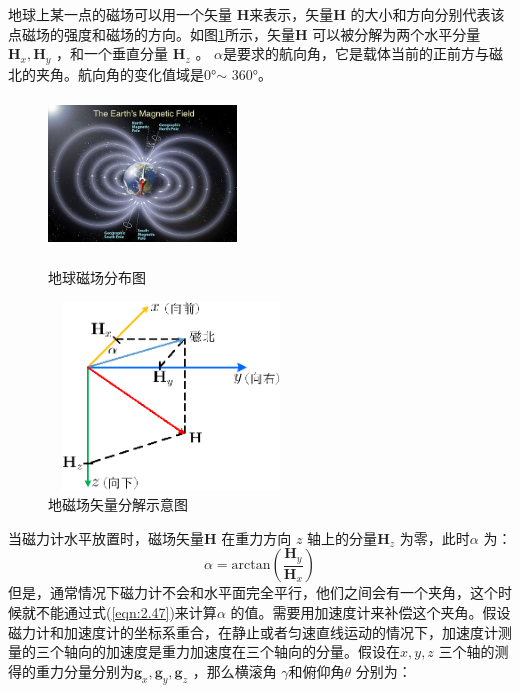 地球上某一点的磁场可以用一个矢量 $\mathbf{H} $来表示，矢量$\mathbf{H} $ 的大小和方向分别代表该点磁场的强度和磁场的方向。如图\ref{fig2_5}所示，矢量$\mathbf{H} $ 可以被分解为两个水平分量 $\mathbf{H}_x,\mathbf{H}_y$ ，和一个垂直分量 $\mathbf{H}_z$ 。 $\alpha$是要求的航向角，它是载体当前的正前方与磁北的夹角。航向角的变化值域是0°$\sim $ 360°。
\begin{figure}[h]\setlength{\belowcaptionskip}{-12pt}
	\centering	
	\begin{minipage}[t]{0.35\linewidth}				
		\includegraphics[height=4cm,width=5cm]{figures/chapter2/fig2_4}		
		\caption{地球磁场分布图}	\label{fig2_4}	
	\end{minipage}%
	\hspace{0.1in}	
	\begin{minipage}[t]{0.5\linewidth}		
		\centering		
		\includegraphics[height=5cm,width=6.5cm]{figures/chapter2/fig2_5}		
		\caption{地磁场矢量分解示意图} \label{fig2_5}		
	\end{minipage}	
\end{figure}
当磁力计水平放置时，磁场矢量$\mathbf{H} $ 在重力方向 $z$ 轴上的分量$\mathbf{H}_z $ 为零，此时$\alpha$ 为：
\begin{equation}
\label{eqn:2.47}
\alpha = \text{arctan}\left(\frac{\mathbf{H}_y}{\mathbf{H}_x}\right)
\end{equation}
但是，通常情况下磁力计不会和水平面完全平行，他们之间会有一个夹角，这个时候就不能通过式(\ref{eqn:2.47})来计算$\alpha$ 的值。需要用加速度计来补偿这个夹角。假设磁力计和加速度计的坐标系重合，在静止或者匀速直线运动的情况下，加速度计测量的三个轴向的加速度是重力加速度在三个轴向的分量。假设在$x,y,z $ 三个轴的测得的重力分量分别为$\mathbf{g}_x, \mathbf{g}_y,\mathbf{g}_z$ ，那么横滚角 $\gamma $和俯仰角$\theta$ 分别为：
